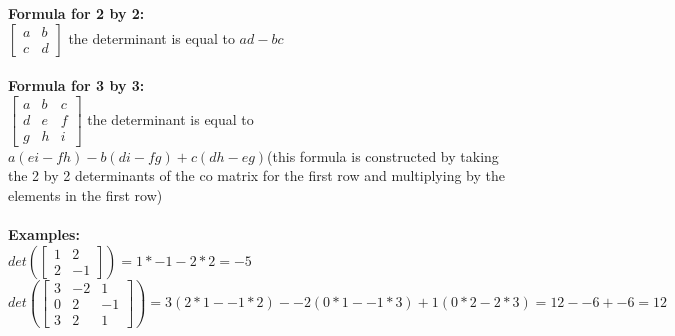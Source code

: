 \documentclass{article}
\begin{document}
\textbf{Formula for 2 by 2: }\\
$\begin{bmatrix}
a & b\\
c & d
\end{bmatrix}$ the determinant is equal to $ad-bc$\\\\
\textbf{Formula for 3 by 3: }\\
$\begin{bmatrix}
a & b & c\\
d & e & f\\
g & h & i
\end{bmatrix}$ the determinant is equal to $a(ei-fh) - b(di-fg) + c(dh-eg)$(this formula is constructed by taking the 2 by 2 determinants of the co matrix for the first row and multiplying by the elements in the first row)\\\\
\textbf{Examples: }\\
$det(
\begin{bmatrix}
1 & 2  \\
2 & -1
\end{bmatrix}) = 1*-1 - 2*2 = -5$\\
$det(
\begin{bmatrix}
3 & -2 & 1  \\
0 & 2 & -1   \\
3 & 2 & 1   
\end{bmatrix}) = 3(2*1- -1*2)- -2(0*1- -1*3) + 1(0*2-2*3) = 12 - -6 + -6 = 12$
\end{document}
